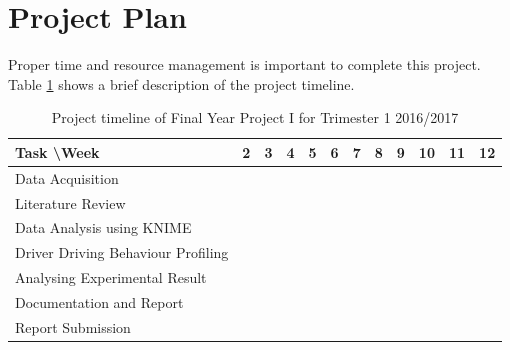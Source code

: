 \section{Project Plan}
Proper time and resource management is important to complete this project. Table \ref{tbl:gantt1} shows a brief description of the project timeline.

\begin{table}[h!]
\begin{tabular}{|l|c|c|c|c|c|c|c|c|c|c|c|}
\hline
Task \textbackslash Week & 2 & 3 & 4 & 5 & 6 & 7 & 8 & 9 & 10 & 11 & 12 \\

\hline
Data Acquisition &  \cellcolor[HTML]{000000} & \cellcolor[HTML]{000000} & \cellcolor[HTML]{000000} & \cellcolor[HTML]{000000} & \cellcolor[HTML]{000000} & & & & & & \\

\hline
Literature Review & & \cellcolor[HTML]{000000} & \cellcolor[HTML]{000000} & \cellcolor[HTML]{000000} & \cellcolor[HTML]{000000} & & & & & & \\

\hline
Data Analysis using KNIME & & & & & & \cellcolor[HTML]{000000} & \cellcolor[HTML]{000000} & \cellcolor[HTML]{000000} & & & \\

\hline
Driver Driving Behaviour Profiling & & & & & & & & \cellcolor[HTML]{000000} & \cellcolor[HTML]{000000} &  & \\

\hline
Analysing Experimental Result & & & & & & & & & \cellcolor[HTML]{000000} & \cellcolor[HTML]{000000} & \\

\hline
Documentation and Report & & & & & & & & & \cellcolor[HTML]{000000} & \cellcolor[HTML]{000000} & \cellcolor[HTML]{000000} \\

\hline
Report Submission & & & & & & & & & & & \cellcolor[HTML]{000000}\\

\hline
\end{tabular}
\label{tbl:gantt1}
\caption{Project timeline of Final Year Project I for Trimester 1 2016/2017}
\end{table}